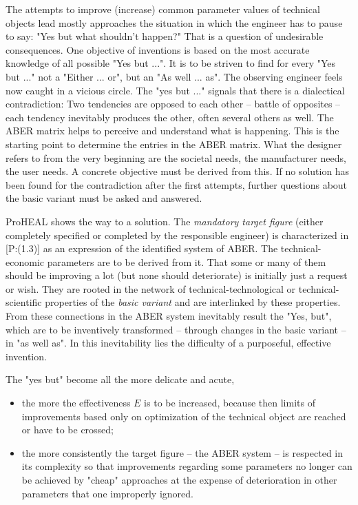 \documentclass[11pt,a4paper]{article}
\begin{document}
The attempts to improve (increase) common parameter values of technical
objects lead mostly approaches the situation in which the engineer has to
pause to say: "Yes but what shouldn't happen?" That is a question of
undesirable consequences. One objective of inventions is based on the most
accurate knowledge of all possible "Yes but ...". It is to be striven to find
for every "Yes but ..."  not a "Either ... or", but an "As well ... as". The
observing engineer feels now caught in a vicious circle. The "yes but ..."
signals that there is a dialectical contradiction: Two tendencies are opposed
to each other -- battle of opposites -- each tendency inevitably produces the
other, often several others as well. The ABER matrix helps to perceive and
understand what is happening. This is the starting point to determine the
entries in the ABER matrix. What the designer refers to from the very
beginning are the societal needs, the manufacturer needs, the user needs. A
concrete objective must be derived from this.  If no solution has been found
for the contradiction after the first attempts, further questions about the
basic variant must be asked and answered.

ProHEAL shows the way to a solution. The \emph{mandatory target figure}
(either completely specified or completed by the responsible engineer) is
characterized in [P:(1.3)] as an expression of the identified system of ABER.
The technical-economic parameters are to be derived from it. That some or many
of them should be improving a lot (but none should deteriorate) is initially
just a request or wish. They are rooted in the network of
technical-technological or technical-scientific properties of the \emph{basic
  variant} and are interlinked by these properties. From these connections in
the ABER system inevitably result the "Yes, but", which are to be inventively
transformed -- through changes in the basic variant -- in "as well as". In
this inevitability lies the difficulty of a purposeful, effective invention.

The "yes but" become all the more delicate and acute, 
\begin{itemize}
\item the more the effectiveness $E$ is to be increased, because then limits
  of improvements based only on optimization of the technical object are
  reached or have to be crossed;
\item the more consistently the target figure -- the ABER system -- is
  respected in its complexity so that improvements regarding some parameters
  no longer can be achieved by "cheap" approaches at the expense of
  deterioration in other parameters that one improperly ignored.
\end{itemize}
\end{document}
